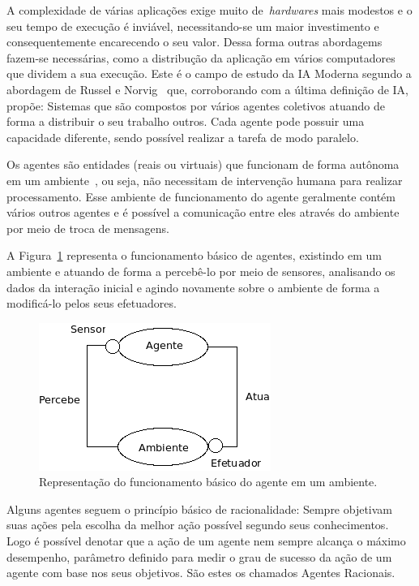 A complexidade de várias aplicações exige muito de~\emph{hardwares} mais modestos e o seu tempo de execução é inviável, necessitando-se um maior investimento e consequentemente encarecendo o seu valor. Dessa forma outras abordagems fazem-se necessárias, como a distribução da aplicação em vários computadores que dividem a sua execução. Este é o campo de estudo da IA Moderna segundo a abordagem de Russel e Norvig~\cite{novig95} que, corroborando com a última definição de IA, propõe: Sistemas que são compostos por vários agentes coletivos atuando de forma a distribuir o seu trabalho outros. Cada agente pode possuir uma capacidade diferente, sendo possível realizar a tarefa de modo paralelo. 

Os agentes são entidades (reais ou virtuais) que funcionam de forma autônoma em um ambiente~\cite{novig95}, ou seja, não necessitam de intervenção humana para realizar processamento. Esse ambiente de funcionamento do agente geralmente contém vários outros agentes e é possível a comunicação entre eles através do ambiente por meio de troca de mensagens.

A Figura~\ref{fig:agente-basico} representa o funcionamento básico de agentes, existindo em um ambiente e atuando de forma a percebê-lo por meio de sensores, analisando os dados da interação inicial e agindo novamente sobre o ambiente de forma a modificá-lo pelos seus efetuadores.

\begin{figure}
	\centering
	\includegraphics[scale=0.75]{images/agente-basico.png}
	\caption{Representação do funcionamento básico do agente em um ambiente.}
	\label{fig:agente-basico}
\end{figure}

Alguns agentes seguem o princípio básico de racionalidade: Sempre objetivam suas ações pela escolha da melhor ação possível segundo seus conhecimentos. Logo é possível denotar que a ação de um agente nem sempre alcança o máximo desempenho, parâmetro definido para medir o grau de sucesso da ação de um agente com base nos seus objetivos. São estes os chamados Agentes Racionais.


